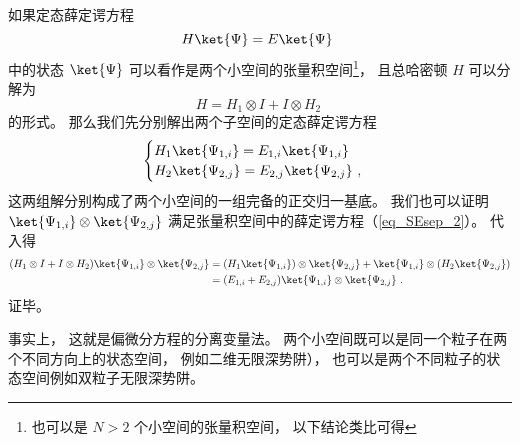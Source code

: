 
\begin{issues}
\end{issues}



如果定态薛定谔方程
\begin{equation}\label{eq_SEsep_2}
H \ket{\Psi} = E \ket{\Psi}~
\end{equation}
中的状态 $\ket{\Psi}$ 可以看作是两个小空间的张量积空间\footnote{也可以是 $N > 2$ 个小空间的张量积空间， 以下结论类比可得}， 且总哈密顿 $H$ 可以分解为
\begin{equation}\label{eq_SEsep_1}
H = H_1 \otimes I + I \otimes H_2~
\end{equation}
的形式。 那么我们先分别解出两个子空间的定态薛定谔方程
\begin{equation}
\begin{cases}
H_1 \ket{\Psi_{1,i}} = E_{1,i} \ket{\Psi_{1,i}}\\
H_2 \ket{\Psi_{2,j}} = E_{2,j} \ket{\Psi_{2,j}}~,
\end{cases}
\end{equation}
这两组解分别构成了两个小空间的一组完备的正交归一基底。 我们也可以证明 $\ket{\Psi_{1,i}} \otimes \ket{\Psi_{2,j}}$ 满足张量积空间中的薛定谔方程（\autoref{eq_SEsep_2}）。 代入得
\begin{equation}
\begin{aligned}
(H_1 \otimes I + I \otimes H_2) \ket{\Psi_{1,i}} \otimes \ket{\Psi_{2,j}} &= (H_1 \ket{\Psi_{1,i}}) \otimes \ket{\Psi_{2,j}} +  \ket{\Psi_{1,i}} \otimes (H_2 \ket{\Psi_{2,j}})\\
&= (E_{1,i} + E_{2, j}) \ket{\Psi_{1,i}} \otimes \ket{\Psi_{2,j}}~.
\end{aligned}
\end{equation}
证毕。

事实上， 这就是偏微分方程的分离变量法。 两个小空间既可以是同一个粒子在两个不同方向上的状态空间， 例如二维无限深势阱）， 也可以是两个不同粒子的状态空间例如双粒子无限深势阱。%
